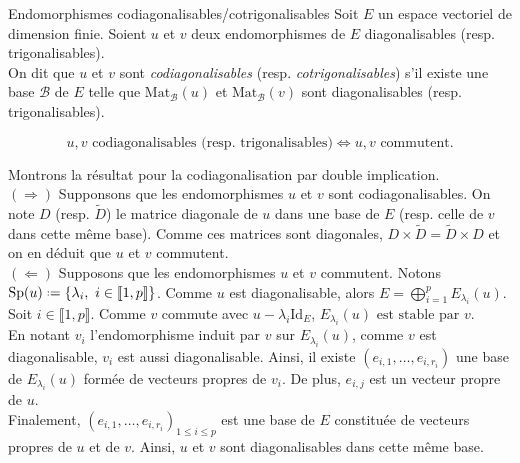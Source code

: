 \begin{defi}{Endomorphismes codiagonalisables/cotrigonalisables}
    Soit $E$ un espace vectoriel de dimension finie. Soient $u$ et $v$ deux endomorphismes de $E$ diagonalisables (resp. trigonalisables). \\
    On dit que $u$ et $v$ sont \emph{codiagonalisables} (resp. \emph{cotrigonalisables}) s'il existe une base $\mathscr{B}$ de $E$ telle que $\mathrm{Mat}_\mathscr{B}(u)$ et $\mathrm{Mat}_\mathscr{B}(v)$ sont diagonalisables (resp. trigonalisables). 
\end{defi}

\begin{prop}{}
    $$u, v \text{ codiagonalisables (resp. trigonalisables)} \Longleftrightarrow u, v \text{ commutent}.$$
\end{prop}

\begin{preuve} 
    Montrons la résultat pour la codiagonalisation par double implication. \\
    $(\Rightarrow)$ Supponsons que les endomorphismes $u$ et $v$ sont codiagonalisables. On note $D$ (resp. $\widetilde{D}$) le matrice diagonale de $u$ dans une base de $E$ (resp. celle de $v$ dans cette même base). Comme ces matrices sont diagonales, $D \times \widetilde{D} = \widetilde{D} \times D$ et on en déduit que $u$ et $v$ commutent. \\
    $(\Leftarrow)$ Supposons que les endomorphismes $u$ et $v$ commutent. Notons $\mathrm{Sp}(u) \defeq \{ \lambda_i,\ i \in \llbracket1, p \rrbracket \}$. Comme $u$ est diagonalisable, alors $E = \bigoplus\limits_{i = 1}^{p} E_{\lambda_i}(u)$. \\
    Soit $i \in \llbracket 1, p \rrbracket$. Comme $v$ commute avec $u - \lambda_i \mathrm{Id}_E$, $E_{\lambda_i}(u) \text{ est stable par } v$. \\
    En notant $v_i$ l'endomorphisme induit par $v$ sur $E_{\lambda_i}(u)$, comme $v$ est diagonalisable, $v_i$ est aussi diagonalisable. Ainsi, il existe $(e_{i, 1}, \dots, e_{i, r_i})$ une base de $E_{\lambda_i}(u)$ formée de vecteurs propres de $v_i$. De plus, $e_{i, j}$ est un vecteur propre de $u$. \\
    Finalement, $(e_{i, 1}, \dots, e_{i, r_i})_{1 \leqslant i \leqslant p}$ est une base de $E$ constituée de vecteurs propres de $u$ et de $v$. Ainsi, $u$ et $v$ sont diagonalisables dans cette même base. 
\end{preuve}

